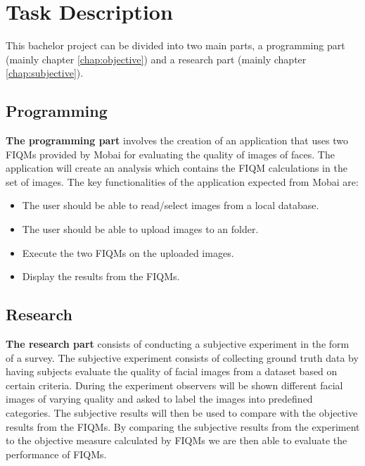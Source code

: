 \section{Task Description}  
\label{sec:TaskD}
This bachelor project can be divided into two main parts, a programming part (mainly chapter \ref{chap:objective}) and a research part (mainly chapter \ref{chap:subjective}).

\subsection*{Programming}
\textbf{The programming part} involves the creation of an application that uses two FIQMs provided by Mobai for evaluating the quality of images of faces. The application will create an analysis which contains the FIQM calculations in the set of images. The key functionalities of the application expected from Mobai are: 
\begin{itemize}
    \item The user should be able to read/select images from a local database.
    \item The user should be able to upload images to an folder.
    \item Execute the two FIQMs on the uploaded images.
    \item Display the results from the FIQMs. 
\end{itemize}

\subsection*{Research}
\textbf{The research part} consists of conducting a subjective experiment in the form of a survey. The subjective experiment consists of collecting ground truth data by having subjects evaluate the quality of facial images from a dataset based on certain criteria. During the experiment observers will be shown different facial images of varying quality and asked to label the images into predefined categories. The subjective results will then be used to compare with the objective results from the FIQMs. By comparing the subjective results from the experiment to the objective measure calculated by FIQMs we are then able to evaluate the performance of FIQMs. 

